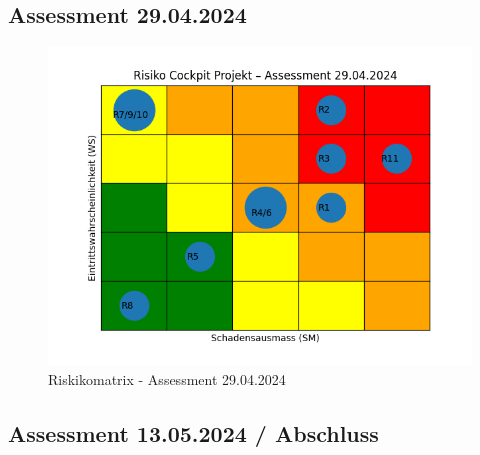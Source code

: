 \clearpage
{}
\recalctypearea
\begin{flushleft}
    \subsection{Assessment 29.04.2024}
    
\end{flushleft}
\clearpage
{}
\recalctypearea
\begin{flushleft}
    \begin{figure}[H]
        \centering
        \includegraphics[width=0.75\linewidth]{source/riskmatrix/project-assessment-29-04-2024}
        \caption{Riskikomatrix - Assessment 29.04.2024}
        \label{fig:project-assessment-29-04-2024}
    \end{figure}
\end{flushleft}
\clearpage
{}
\recalctypearea
\begin{flushleft}
    \subsection{Assessment 13.05.2024 / Abschluss}
    
\end{flushleft}
\clearpage

